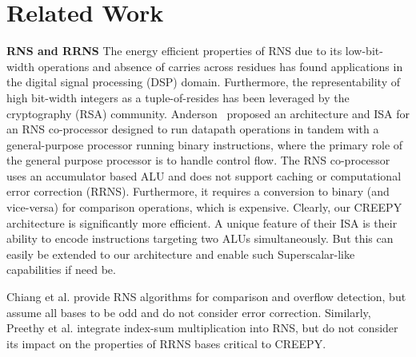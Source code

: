 \documentclass{sig-alternate}
\begin{document}










\section{Related Work}
\label{sec:related}

\textbf{RNS and RRNS}
The energy efficient properties of RNS due to its low-bit-width operations and absence of carries across residues has found applications in the digital signal processing (DSP) \cite{Chokshi,Claudio,Ramirez} domain. Furthermore, the representability of high bit-width integers as a tuple-of-resides has been leveraged by the cryptography (RSA) \cite{bajard2004RSA,hung1994RSA,yen2003RSA} community. Anderson~\cite{AndersonThesis} proposed an architecture and ISA for an RNS co-processor designed to run datapath operations in tandem with a general-purpose processor running binary instructions, where the primary role of the general purpose processor is to handle control flow. The RNS co-processor uses an accumulator based ALU and does not support caching or computational error correction (RRNS). Furthermore, it requires a conversion to binary (and vice-versa) for comparison operations, which is expensive. Clearly, our CREEPY architecture is significantly more efficient. A unique feature of their ISA is their ability to encode instructions targeting two ALUs simultaneously. But this can easily be extended to our architecture and enable such Superscalar-like capabilities if need be.

Chiang et al. \cite{JSHIUN_FP} provide RNS algorithms for comparison and overflow detection, but assume all bases to be odd and do not consider error correction. Similarly, Preethy et al. \cite{preethy1999,preethy2000rns} integrate index-sum multiplication into RNS, but do not consider its impact on the properties of RRNS bases critical to CREEPY.
\end{document}
